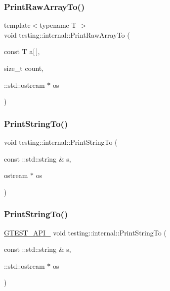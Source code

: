 \mbox{\label{namespacetesting_1_1internal_ad3013b6b4c825edee9fe18ff1d982faa}} 
\subsubsection{\texorpdfstring{PrintRawArrayTo()}{PrintRawArrayTo()}}
{\footnotesize\ttfamily template$<$typename T $>$ \\
void testing\+::internal\+::\+Print\+Raw\+Array\+To (\begin{DoxyParamCaption}\item[{const T}]{a\mbox{[}$\,$\mbox{]},  }\item[{size\+\_\+t}]{count,  }\item[{\+::std\+::ostream $\ast$}]{os }\end{DoxyParamCaption})}

\mbox{\label{namespacetesting_1_1internal_ad609167d8d6792b0fb186539e0e159bd}} 
\subsubsection{\texorpdfstring{PrintStringTo()}{PrintStringTo()}\hspace{0.1cm}{\footnotesize\ttfamily [1/2]}}
{\footnotesize\ttfamily void testing\+::internal\+::\+Print\+String\+To (\begin{DoxyParamCaption}\item[{const \+::std\+::string \&}]{s,  }\item[{ostream $\ast$}]{os }\end{DoxyParamCaption})}

\mbox{\label{namespacetesting_1_1internal_a8b53e46cea3f8bdfc9342057c4f6ba62}} 
\subsubsection{\texorpdfstring{PrintStringTo()}{PrintStringTo()}\hspace{0.1cm}{\footnotesize\ttfamily [2/2]}}
{\footnotesize\ttfamily \mbox{\hyperlink{gtest-port_8h_aa73be6f0ba4a7456180a94904ce17790}{G\+T\+E\+S\+T\+\_\+\+A\+P\+I\+\_\+}} void testing\+::internal\+::\+Print\+String\+To (\begin{DoxyParamCaption}\item[{const \+::std\+::string \&}]{s,  }\item[{\+::std\+::ostream $\ast$}]{os }\end{DoxyParamCaption})}

